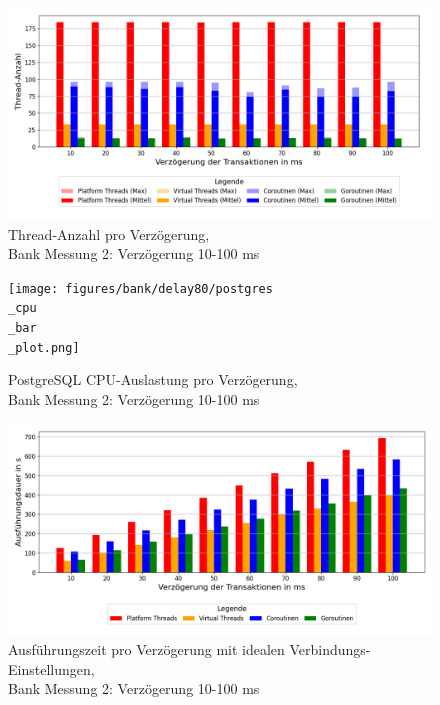 \documentclass[fontsize=12pt,paper=a4,twoside=semi,parskip=half-,headsepline,headinclude]{scrreprt}
\begin{document}
\begin{figure}[H]
	\centering
	\includegraphics[scale=0.5]{figures/bank/delay80/num_threads_bar_plot.png}
	\caption{Thread-Anzahl pro Verzögerung,\\ Bank Messung 2: Verzögerung 10-100 ms}
	\label{fig:bankDelay80Threads}
\end{figure}

\begin{figure}[H]
	\centering
	\texttt{[image: figures/bank/delay80/postgres\\\_cpu\\\_bar\\\_plot.png]}
	\caption{PostgreSQL CPU-Auslastung pro Verzögerung,\\ Bank Messung 2: Verzögerung 10-100 ms}
	\label{fig:bankDelay80PostgCPU}
\end{figure}

\begin{figure}[H]
	\centering
	\includegraphics[scale=0.5]{figures/bank/delayIdeal/execution_time_plot.png}
	\caption{Ausführungszeit pro Verzögerung mit idealen Verbindungs-Einstellungen,\\ Bank Messung 2: Verzögerung 10-100 ms}
	\label{fig:bankdelayIdealZeit}
\end{figure}
\end{document}
